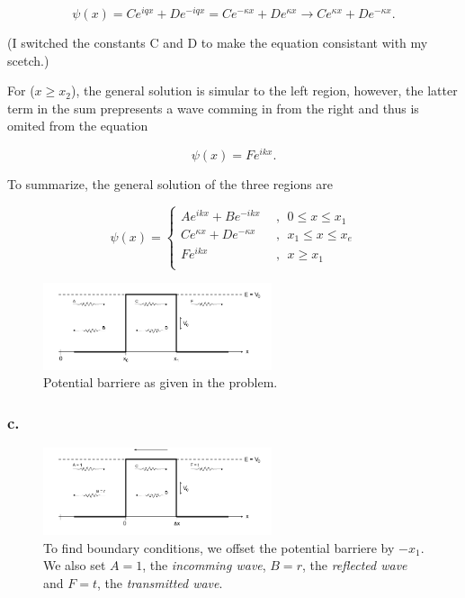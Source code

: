 \documentclass{article}
\begin{document}
\begin{equation}
\psi(x) = Ce^{iqx} + De^{-iqx} = Ce^{-\kappa x} + De^{\kappa x} \rightarrow Ce^{\kappa x} + De^{-\kappa x}.
\end{equation}

(I switched the constants C and D to make the equation consistant with my scetch.)

For ($x \geq x_2$), the general solution is simular to the left region, however, the latter term in the sum prepresents a wave comming in from the right and thus is omited from the equation

\begin{equation}
\psi(x) = Fe^{ikx}.
\end{equation}

To summarize, the general solution of the three regions are

\begin{equation}
\psi(x) = \begin{cases}
Ae^{ikx} + Be^{-ikx} \ \ &, \ \ 0 \leq x \leq x_1 \\
Ce^{\kappa x} + De^{-\kappa x} \ \ &, \ \ x_1 \leq x \leq x_e \\
Fe^{ikx}  &, \ \ x \geq x_1 \\
\end{cases}
\end{equation}


\begin{figure}[t]
\centering
\includegraphics[width=0.6\textwidth]{potentialbarriere}
\caption{Potential barriere as given in the problem.}
\label{fig:figure_label}
\end{figure}


\subsubsection*{c.}

\begin{figure}[t]
\centering
\includegraphics[width=0.6\textwidth]{potentialbarriereoffset}
\caption{To find boundary conditions, we offset the potential barriere by $-x_1$. We also set $A=1$, the \textit{incomming wave}, $B=r$, the \textit{reflected wave} and $F=t$, the \textit{transmitted wave}.}
\label{fig:figure_label}
\end{figure}
\end{document}
